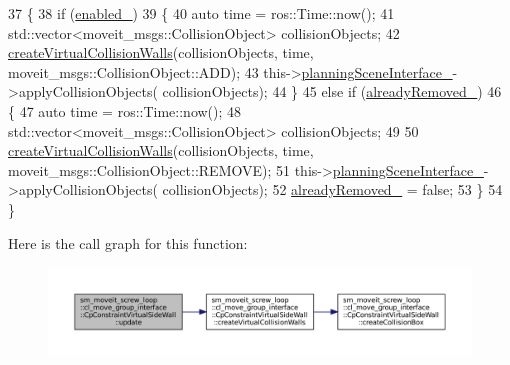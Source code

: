 \begin{DoxyCode}
37         \{
38             \textcolor{keywordflow}{if} (\hyperlink{classsm__moveit__screw__loop_1_1cl__move__group__interface_1_1CpConstraintVirtualSideWall_a3ad858929f75175c5c7955b76bb095ec}{enabled\_})
39             \{
40                 \textcolor{keyword}{auto} time = ros::Time::now();
41                 std::vector<moveit\_msgs::CollisionObject> collisionObjects;
42                 \hyperlink{classsm__moveit__screw__loop_1_1cl__move__group__interface_1_1CpConstraintVirtualSideWall_afea3c873645eee21c6ab1d3b43f59c35}{createVirtualCollisionWalls}(collisionObjects, time, 
      moveit\_msgs::CollisionObject::ADD);
43                 this->\hyperlink{classsm__moveit__screw__loop_1_1cl__move__group__interface_1_1CpConstraintVirtualSideWall_a457d54c11f9b78f4b411f52964c46151}{planningSceneInterface\_}->applyCollisionObjects(
      collisionObjects);
44             \}
45             \textcolor{keywordflow}{else} \textcolor{keywordflow}{if} (\hyperlink{classsm__moveit__screw__loop_1_1cl__move__group__interface_1_1CpConstraintVirtualSideWall_a5a48090196dffd58a81f2d6cf77e2405}{alreadyRemoved\_})
46             \{
47                 \textcolor{keyword}{auto} time = ros::Time::now();
48                 std::vector<moveit\_msgs::CollisionObject> collisionObjects;
49 
50                 \hyperlink{classsm__moveit__screw__loop_1_1cl__move__group__interface_1_1CpConstraintVirtualSideWall_afea3c873645eee21c6ab1d3b43f59c35}{createVirtualCollisionWalls}(collisionObjects, time, 
      moveit\_msgs::CollisionObject::REMOVE);
51                 this->\hyperlink{classsm__moveit__screw__loop_1_1cl__move__group__interface_1_1CpConstraintVirtualSideWall_a457d54c11f9b78f4b411f52964c46151}{planningSceneInterface\_}->applyCollisionObjects(
      collisionObjects);
52                 \hyperlink{classsm__moveit__screw__loop_1_1cl__move__group__interface_1_1CpConstraintVirtualSideWall_a5a48090196dffd58a81f2d6cf77e2405}{alreadyRemoved\_} = \textcolor{keyword}{false};
53             \}
54         \}
\end{DoxyCode}
Here is the call graph for this function\+:
\nopagebreak
\begin{figure}[H]
\begin{center}
\leavevmode
\includegraphics[width=350pt]{classsm__moveit__screw__loop_1_1cl__move__group__interface_1_1CpConstraintVirtualSideWall_a4582ad379597080236133d0f354f694e_cgraph}
\end{center}
\end{figure}
